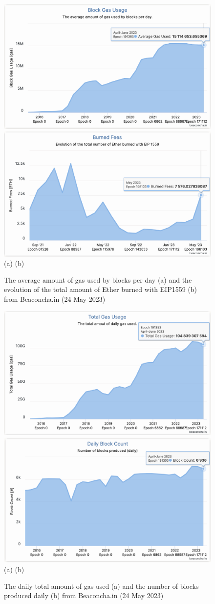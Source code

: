 \documentclass[UTF8]{article}
\begin{document}
\begin{figure}[htbp]
\begin{center}
\includegraphics[width=0.48\linewidth]{images/bchart19}
\includegraphics[width=0.48\linewidth]{images/bchart20} \\
(a)\hspace{160pt}        (b)\\
\caption{The average amount of gas used by blocks per day (a) and the evolution of the total amount of Ether burned with EIP1559 (b) from Beaconcha.in (24 May 2023)}
\label{fig:chart19}
\end{center}
\end{figure}

\begin{figure}[htbp]
\begin{center}
\includegraphics[width=0.48\linewidth]{images/bchart21}
\includegraphics[width=0.48\linewidth]{images/bchart22} \\
(a)\hspace{160pt}        (b)\\
\caption{The daily total amount of gas used  (a) and the number of blocks produced daily (b) from Beaconcha.in (24 May 2023)}
\label{fig:chart21}
\end{center}
\end{figure}
\end{document}
